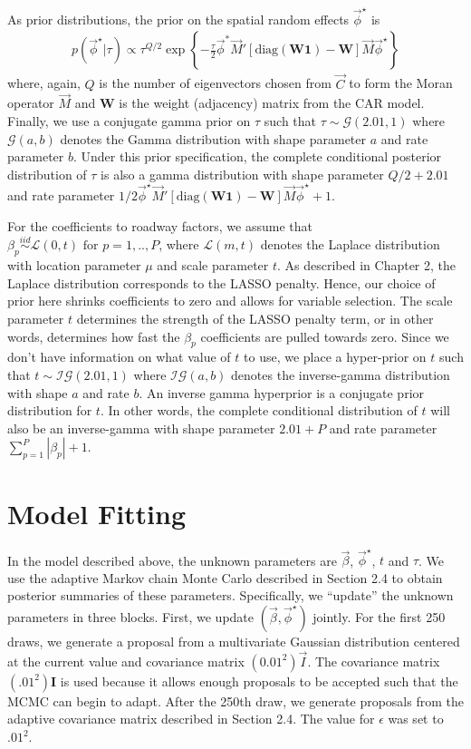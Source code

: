 As prior distributions, the prior on the spatial random effects $\vec{\phi}^\star$ is
\begin{align}
p(\vec{\phi}^\star|\tau) \propto \tau^{Q/2} \exp\left\{- \frac{\tau}{2} \vec{\phi}^* \vec{M}'\left[\text{diag}(\bm{W}\bm{1}) - \bm{W}\right]\vec{M} \vec{\phi}^\star\right\}
\end{align}
where, again, $Q$ is the number of eigenvectors chosen from $\vec{C}$ to form the Moran operator $\vec{M}$ and $\bm{W}$ is the weight (adjacency) matrix from the CAR model.  Finally, we use a conjugate gamma prior on $\tau$ such that $\tau \sim \mathcal{G}(2.01,1)$ where $\mathcal{G}(a,b)$ denotes the Gamma distribution with shape parameter $a$ and rate parameter $b$. Under this prior specification, the complete conditional posterior distribution of $\tau$ is also a gamma distribution with shape parameter $Q/2 + 2.01$ and rate parameter $1/2 \vec{\phi}^\star  \vec{M}'\left[\text{diag}(\bm{W}\bm{1}) - \bm{W}\right]\vec{M} \vec{\phi}^\star + 1$.

For the coefficients to roadway factors, we assume that $\beta_p \stackrel{iid}{\sim} \mathcal{L}(0,t) \textrm{ for }  p=1,..,P$, where $\mathcal{L}(m,t)$ denotes the Laplace distribution with location parameter $\mu$ and scale parameter $t$.  As described in Chapter 2, the Laplace distribution corresponds to the LASSO penalty.  Hence, our choice of prior here shrinks coefficients to zero and allows for variable selection.  The scale parameter $t$ determines the strength of the LASSO penalty term, or in other words, determines how fast the $\beta_p$ coefficients are pulled towards zero. Since we don't have information on what value of $t$ to use, we place a hyper-prior on $t$ such that $t \sim \mathcal{IG}(2.01,1)$ where $\mathcal{IG}(a,b)$ denotes the inverse-gamma distribution with shape $a$ and rate $b$. An inverse gamma hyperprior is a conjugate prior distribution for $t$.  In other words, the complete conditional  distribution of $t$ will also be an inverse-gamma with shape parameter $2.01 + P$ and rate parameter $\sum_{p=1}^P |\beta_p| + 1$.



\section{Model Fitting}

In the model described above, the unknown parameters are $\vec{\beta}$, $\vec{\phi}^\star$, $t$ and $\tau$.  We use the adaptive Markov chain Monte Carlo described in Section 2.4 to obtain posterior summaries of these parameters. Specifically, we ``update'' the unknown parameters in three blocks.  First, we update $(\vec{\beta},\vec{\phi}^\star)$ jointly. For the first 250 draws, we generate a proposal from a multivariate Gaussian distribution centered at the current value and covariance matrix $(0.01^2)\vec{I}$. The covariance matrix $(.01^2)\bm{I}$ is used because it allows enough proposals to be accepted such that the MCMC can begin to adapt. After the 250th draw, we generate proposals from the adaptive covariance matrix described in Section 2.4. The value for  $\epsilon$ was set to $.01^2$.

